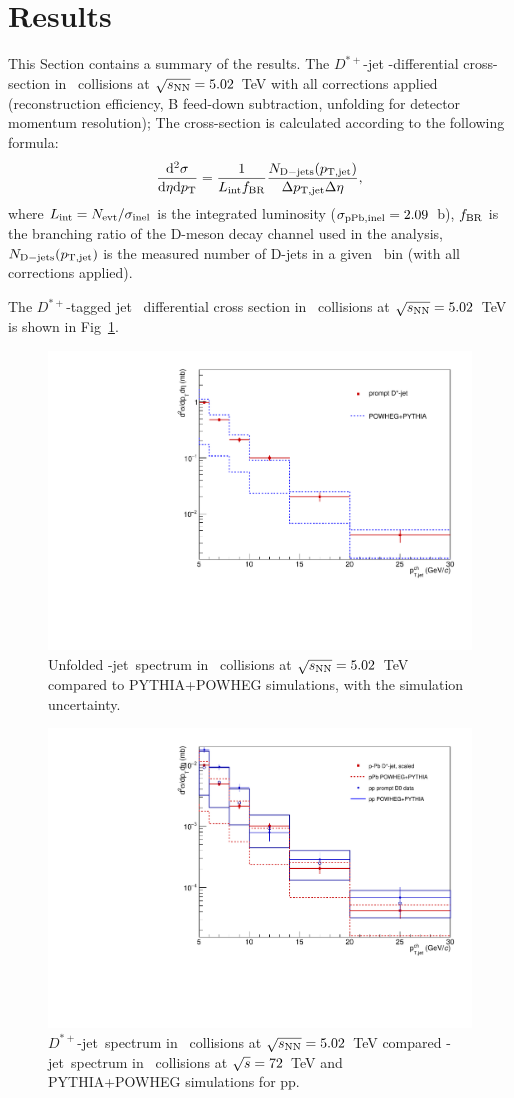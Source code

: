 \section{Results}
This Section contains a summary of the results.
The  $D^{*+}$-jet \pt-differential cross-section in \pPb\ collisions at $\sqrt{s_{\rm NN}}=5.02$~TeV  with all corrections applied (reconstruction efficiency, B feed-down subtraction, unfolding for detector momentum resolution);
The cross-section is calculated according to the following formula:
\begin{equation}
\frac{{\rm d}^2\sigma}{{\rm d}\eta {\rm d}p_{\rm T}}=\frac{1}{L_{\rm int}f_{\rm BR}} \frac{N_{\rm D-jets}(p_{\mathrm{T,jet}})}{\Delta p_{\mathrm{T,jet}}\Delta\eta},
\end{equation}
where $L_{\rm int}=N_{\rm evt}/\sigma_{\rm inel}$ is the integrated luminosity ($\sigma_{\rm pPb, inel} = 2.09$~b), $f_{\rm BR}$ is the branching
ratio of the D-meson decay channel used in the analysis, $N_{\rm D-jets}(p_{\mathrm{T,jet}})$ is the measured number of D-jets in a given \ptjet\ bin (with all corrections applied).

The $D^{*+}$-tagged jet \pt\ differential cross section in \pPb\ collisions at $\sqrt{s_{\rm NN}}=5.02$~TeV is shown in Fig~\ref{fig:pPbJetPt_final}.
\begin{figure}[bth]
\centering
\includegraphics[width=.53\textwidth]{pPbplots/jetSpectra/JetPtSpectra_final}
\caption{Unfolded \Dstar-jet\ spectrum in \pPb\ collisions at $\sqrt{s_{\rm NN}}=5.02$~TeV compared to PYTHIA+POWHEG simulations, with the simulation uncertainty.}
\label{fig:pPbJetPt_final}
\end{figure}

\begin{figure}[bth]
\centering
\includegraphics[width=.53\textwidth]{pPbplots/jetSpectra/JetPtSpectra_final_wpp}
\caption{$D^{*+}$-jet\ spectrum in \pPb\ collisions at $\sqrt{s_{\rm NN}}=5.02$~TeV compared \Dzero-jet\ spectrum in \pp\ collisions at $\sqrt{s}=72$~TeV and PYTHIA+POWHEG simulations for pp.}
\label{fig:pPbJetPt_final_wpp}
\end{figure}



